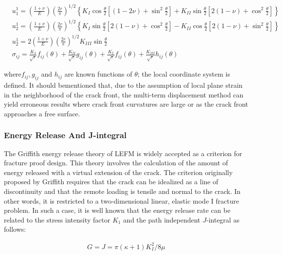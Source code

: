 \documentclass[12pt]{article}
\begin{document}
\begin{align*}
    &u_{1}^{1} = \left(\frac{1 + \nu}{E}\right)\left(\frac{2r}{\pi}\right) ^{1/2} \left\{K_I\cos\frac{\theta}{2}\left[(1-2\nu)+\sin ^ 2 \frac{\theta}{2}\right] + K_{II}\sin \frac{\theta}{2}\left[2(1 - \nu) + \cos ^ 2 \frac{\theta}{2}\right]\right\}\\
    &u_{2}^{1} = \left(\frac{1 + \nu}{E}\right)\left(\frac{2r}{\pi}\right) ^{1/2} \left\{K_I\sin\frac{\theta}{2}\left[2(1-\nu)+\cos ^ 2 \frac{\theta}{2}\right] - K_{II}\cos \frac{\theta}{2}\left[2(1 - \nu) + \sin ^ 2 \frac{\theta}{2}\right]\right\}
 \\ &u_{2}^{1} = 2\left(\frac{1 + \nu}{E}\right)\left(\frac{2r}{\pi}\right) ^{1/2} K_{III}\sin \frac{\theta}{2} \tag{15} \label{15}\
 \\&\sigma_{ij} = \frac{K_{I}}{\sqrt{r}}f_{ij}(\theta) + \frac{K_{II}}{\sqrt{r}}g_{ij}(\theta) + \frac{K_{I}}{\sqrt{r}}f_{ij}(\theta) + \frac{K_{III}}{\sqrt{r}}h_{ij}(\theta) \tag{16} \label{16}
\end{align*}


where$ f_{ij}, g_{ij}$ and $h_{ij}$ are known functions of $\theta$; the local coordinate system is defined.
It should bementioned that, due to the assumption of local plane strain in the neighborhood of the crack front,
the multi-term displacement method can yield erroneous results where crack front curvatures are
large or as the crack front approaches a free surface.

\subsubsection{Energy Release And J-integral}

The Griffith energy release theory of LEFM is widely accepted as a criterion for fracture proof
design. This theory involves the calculation of the amount of energy released with a virtual
extension of the crack. The criterion originally proposed by Griffith requires that the crack can
be idealized as a line of discontinuity and that the remote loading is tensile and normal to the crack.
In other words, it is restricted to a two-dimensional linear, elastic mode I fracture problem. In such
a case, it is well known that the energy release rate can be related to the stress intensity factor $K_1$
and the path independent $J$-integral as follows:

\begin{align*}
    G = J = \pi (\kappa + 1 ) K_{I}^{2}/ 8 \mu \tag{17} \label{17}
\end{align*}
\end{document}
